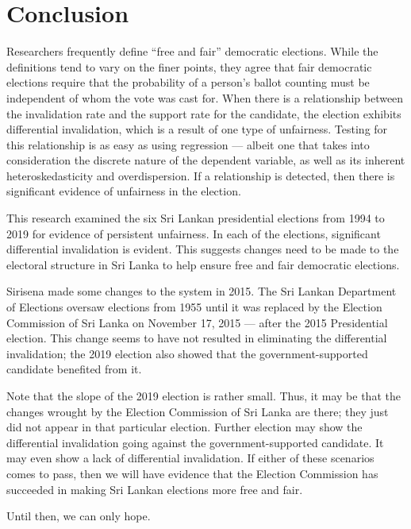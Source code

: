 \section{Conclusion}
Researchers frequently define ``free and fair'' democratic elections. While the definitions tend to vary on the finer points, they agree that fair democratic elections require that the probability of a person's ballot counting must be independent of whom the vote was cast for. When there is a relationship between the invalidation rate and the support rate for the candidate, the election exhibits differential invalidation, which is a result of one type of unfairness. Testing for this relationship is as easy as using regression --- albeit one that takes into consideration the discrete nature of the dependent variable, as well as its inherent heteroskedasticity and overdispersion. If a relationship is detected, then there is significant evidence of unfairness in the election.

This research examined the six Sri Lankan presidential elections from 1994 to 2019 for evidence of persistent unfairness. In each of the elections, significant differential invalidation is evident. This suggests changes need to be made to the electoral structure in Sri Lanka to help ensure free and fair democratic elections.

Sirisena made some changes to the system in 2015. The Sri Lankan Department of Elections oversaw elections from 1955 until it was replaced by the Election Commission of Sri Lanka on November 17, 2015 --- after the 2015 Presidential election.\cite{electioncommission-2018b} This change seems to have not resulted in eliminating the differential invalidation; the 2019 election also showed that the government-supported candidate benefited from it. 

Note that the slope of the 2019 election is rather small. Thus, it may be that the changes wrought by the Election Commission of Sri Lanka are there; they just did not appear in that particular election. Further election may show the differential invalidation going against the government-supported candidate. It may even show a lack of differential invalidation. If either of these scenarios comes to pass, then we will have evidence that the Election Commission has succeeded in making Sri Lankan elections more free and fair.

Until then, we can only hope.










